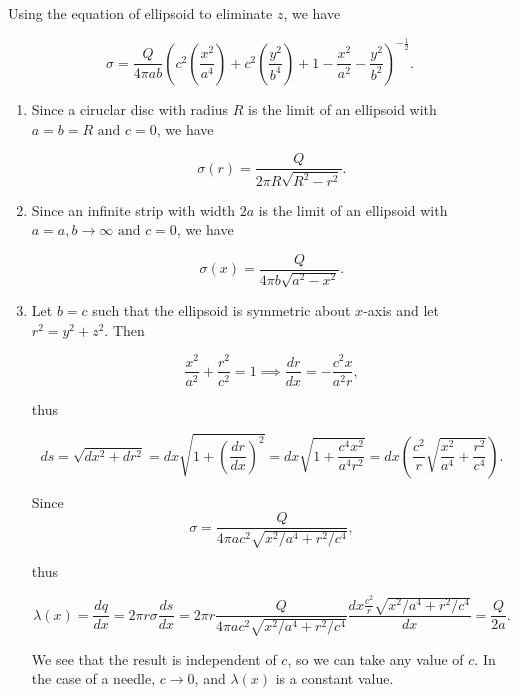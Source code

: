 \documentclass[english,a4paper,12pt]{report}
\begin{document}
{Using the equation of ellipsoid to eliminate \(z\), we have
		
\begin{equation}
    \sigma = \frac{Q}{4\pi ab} \left(c^2\left(\frac{x^2}{a^4}\right) + c^2\left(\frac{y^2}{b^4} \right) + 1 - \frac{x^2}{a^2}  - \frac{y^2}{b^2} \right)^{-\frac{1}{2} }.
\end{equation}

\begin{enumerate}
    \item Since a ciruclar disc with radius \(R\) is the limit of an ellipsoid with \(a = b = R \text { and } c = 0\), we have  

    \begin{equation}
        \sigma (r) = \frac{Q}{2\pi R\sqrt{R^2-r^2} }.
    \end{equation}

    \item Since an infinite strip with width \(2a\) is the limit of an ellipsoid with \(a = a, b \to \infty \text { and } c = 0\), we have  

    \begin{equation}
        \sigma (x) = \frac{Q}{4\pi b\sqrt{a^2 - x^2} }  .
    \end{equation}

    \item Let \(b = c\) such that the ellipsoid is symmetric about \(x\)-axis and let \(r^2 = y^2 + z^2\). Then

    \begin{equation}
        \frac{x^2}{a^2} + \frac{r^2}{c^2} = 1 \implies \frac{dr}{dx} = -\frac{c^2x}{a^2r},
    \end{equation}
    
    thus

    \begin{equation}
        ds = \sqrt{dx^2+dr^2} = dx \sqrt{1+\left(\frac{dr}{dx} \right)^2} = dx \sqrt{1+\frac{c^4x^2}{a^4r^2} } = dx \left( \frac{c^2}{r} \sqrt{\frac{x^2}{a^4} + \frac{r^2}{c^4} }\right) . 
    \end{equation}
    
    Since 
    \begin{equation}
        \sigma = \frac{Q}{4\pi ac^2\sqrt{x^2/a^4 + r^2/c^4 } },
    \end{equation}

    thus
    
    \begin{equation}
        \lambda (x) = \frac{dq}{dx} = 2\pi r\sigma \frac{ds}{dx}  = 2\pi r \frac{Q}{4\pi ac^2\sqrt{x^2/a^4 + r^2/c^4} }\frac{dx \frac{c^2}{r} \sqrt{x^2/a^4 + r^2/c^4 } 
        }{dx} = \frac{Q}{2a} .
    \end{equation}
    
    We see that the result is independent of \(c\), so we can take any value of \(c\). In the case of a needle, \(c \rightarrow  0\), and \(\lambda (x)\) is a constant value.
\end{enumerate}~} 
\end{document}
